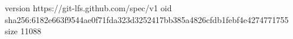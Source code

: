 version https://git-lfs.github.com/spec/v1
oid sha256:6182e663f9544ae0f71fda323d3252417bb385a4826cfdb1febf4e4274771755
size 11088
